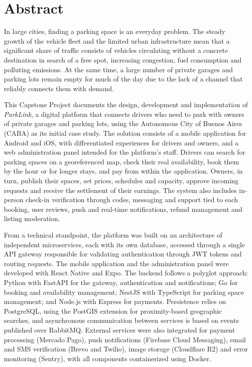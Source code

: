 \section{Abstract}
In large cities, finding a parking space is an everyday problem. The steady growth of the vehicle fleet and the limited urban infrastructure mean that a significant share of traffic consists of vehicles circulating without a concrete destination in search of a free spot, increasing congestion, fuel consumption and polluting emissions. At the same time, a large number of private garages and parking lots remain empty for much of the day due to the lack of a channel that reliably connects them with demand.

This Capstone Project documents the design, development and implementation of \textit{ParkLink}, a digital platform that connects drivers who need to park with owners of private garages and parking lots, using the Autonomous City of Buenos Aires (CABA) as its initial case study. The solution consists of a mobile application for Android and iOS, with differentiated experiences for drivers and owners, and a web administration panel intended for the platform's staff. Drivers can search for parking spaces on a georeferenced map, check their real availability, book them by the hour or for longer stays, and pay from within the application. Owners, in turn, publish their spaces, set prices, schedules and capacity, approve incoming requests and receive the settlement of their earnings. The system also includes in-person check-in verification through codes, messaging and support tied to each booking, user reviews, push and real-time notifications, refund management and listing moderation.

From a technical standpoint, the platform was built on an architecture of independent microservices, each with its own database, accessed through a single API gateway responsible for validating authentication through JWT tokens and routing requests. The mobile application and the administration panel were developed with React Native and Expo. The backend follows a polyglot approach: Python with FastAPI for the gateway, authentication and notifications; Go for booking and availability management; NestJS with TypeScript for parking space management; and Node.js with Express for payments. Persistence relies on PostgreSQL, using the PostGIS extension for proximity-based geographic searches, and asynchronous communication between services is based on events published over RabbitMQ. External services were also integrated for payment processing (Mercado Pago), push notifications (Firebase Cloud Messaging), email and SMS verification (Brevo and Twilio), image storage (Cloudflare R2) and error monitoring (Sentry), with all components containerized using Docker.

